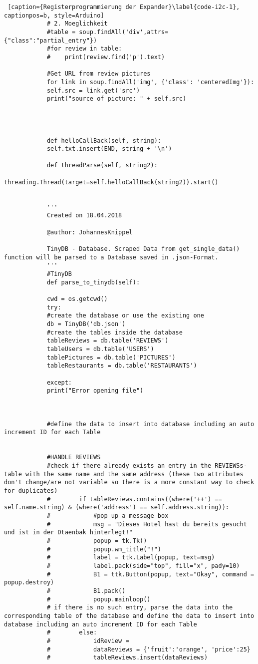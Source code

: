 \documentclass[a4paper,oneside,12pt]{report}
\begin{document}
\begin{lstlisting} [caption={Registerprogrammierung der Expander}\label{code-i2c-1}, captionpos=b, style=Arduino]
			# 2. Moeglichkeit
			#table = soup.findAll('div',attrs={"class":"partial_entry"})
			#for review in table:
			#    print(review.find('p').text)
			
			#Get URL from review pictures
			for link in soup.findAll('img', {'class': 'centeredImg'}):
			self.src = link.get('src')
			print("source of picture: " + self.src)
			
			
			
			
			def helloCallBack(self, string):
			self.txt.insert(END, string + '\n')
			
			def threadParse(self, string2):
			threading.Thread(target=self.helloCallBack(string2)).start()
			
			
			'''
			Created on 18.04.2018
			
			@author: JohannesKnippel
			
			TinyDB - Database. Scraped Data from get_single_data() function will be parsed to a Database saved in .json-Format.
			'''
			#TinyDB
			def parse_to_tinydb(self):
			
			cwd = os.getcwd()
			try:
			#create the database or use the existing one
			db = TinyDB('db.json')
			#create the tables inside the database
			tableReviews = db.table('REVIEWS')
			tableUsers = db.table('USERS')
			tablePictures = db.table('PICTURES')
			tableRestaurants = db.table('RESTAURANTS')
			
			except:
			print("Error opening file")    
			
			
			
			#define the data to insert into database including an auto increment ID for each Table  
			
			
			#HANDLE REVIEWS
			#check if there already exists an entry in the REVIEWSs-table with the same name and the same address (these two attributes don't change/are not variable so there is a more constant way to check for duplicates)
			#        if tableReviews.contains((where('++') == self.name.string) & (where('address') == self.address.string)): 
			#            #pop up a message box
			#            msg = "Dieses Hotel hast du bereits gesucht und ist in der Dtaenbak hinterlegt!"
			#            popup = tk.Tk()
			#            popup.wm_title("!")
			#            label = ttk.Label(popup, text=msg)
			#            label.pack(side="top", fill="x", pady=10)
			#            B1 = ttk.Button(popup, text="Okay", command = popup.destroy)
			#            B1.pack()
			#            popup.mainloop()
			# if there is no such entry, parse the data into the corresponding table of the database and define the data to insert into database including an auto increment ID for each Table       
			#        else:
			#            idReview =   
			#            dataReviews = {'fruit':'orange', 'price':25}
			#            tableReviews.insert(dataReviews)
			

\end{lstlisting}
\end{document}
